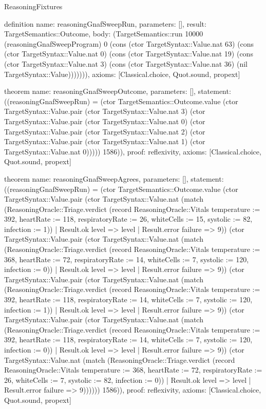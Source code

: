 \begin{lexlean}{ReasoningFixtures}
\begin{semanticmodule}
definition{
  name: reasoningGnafSweepRun,
  parameters: [],
  result: TargetSemantics::Outcome,
  body: (TargetSemantics::run 10000 (reasoningGnafSweepProgram) 0 (cons (ctor TargetSyntax::Value.nat 63) (cons (ctor TargetSyntax::Value.nat 0) (cons (ctor TargetSyntax::Value.nat 19) (cons (ctor TargetSyntax::Value.nat 3) (cons (ctor TargetSyntax::Value.nat 36) (nil TargetSyntax::Value))))))),
  axioms: [Classical.choice, Quot.sound, propext]
}

theorem{
  name: reasoningGnafSweepOutcome,
  parameters: [],
  statement: ((reasoningGnafSweepRun) = (ctor TargetSemantics::Outcome.value (ctor TargetSyntax::Value.pair (ctor TargetSyntax::Value.nat 3) (ctor TargetSyntax::Value.pair (ctor TargetSyntax::Value.nat 0) (ctor TargetSyntax::Value.pair (ctor TargetSyntax::Value.nat 2) (ctor TargetSyntax::Value.pair (ctor TargetSyntax::Value.nat 1) (ctor TargetSyntax::Value.nat 0))))) 1586)),
  proof: reflexivity{},
  axioms: [Classical.choice, Quot.sound, propext]
}

theorem{
  name: reasoningGnafSweepAgrees,
  parameters: [],
  statement: ((reasoningGnafSweepRun) = (ctor TargetSemantics::Outcome.value (ctor TargetSyntax::Value.pair (ctor TargetSyntax::Value.nat (match (ReasoningOracle::Triage.verdict (record ReasoningOracle::Vitals {temperature := 392, heartRate := 118, respiratoryRate := 26, whiteCells := 15, systolic := 82, infection := 1}))
    | Result.ok level => level
    | Result.error failure => 9)) (ctor TargetSyntax::Value.pair (ctor TargetSyntax::Value.nat (match (ReasoningOracle::Triage.verdict (record ReasoningOracle::Vitals {temperature := 368, heartRate := 72, respiratoryRate := 14, whiteCells := 7, systolic := 120, infection := 0}))
    | Result.ok level => level
    | Result.error failure => 9)) (ctor TargetSyntax::Value.pair (ctor TargetSyntax::Value.nat (match (ReasoningOracle::Triage.verdict (record ReasoningOracle::Vitals {temperature := 392, heartRate := 118, respiratoryRate := 14, whiteCells := 7, systolic := 120, infection := 1}))
    | Result.ok level => level
    | Result.error failure => 9)) (ctor TargetSyntax::Value.pair (ctor TargetSyntax::Value.nat (match (ReasoningOracle::Triage.verdict (record ReasoningOracle::Vitals {temperature := 392, heartRate := 118, respiratoryRate := 14, whiteCells := 7, systolic := 120, infection := 0}))
    | Result.ok level => level
    | Result.error failure => 9)) (ctor TargetSyntax::Value.nat (match (ReasoningOracle::Triage.verdict (record ReasoningOracle::Vitals {temperature := 368, heartRate := 72, respiratoryRate := 26, whiteCells := 7, systolic := 82, infection := 0}))
    | Result.ok level => level
    | Result.error failure => 9)))))) 1586)),
  proof: reflexivity{},
  axioms: [Classical.choice, Quot.sound, propext]
}


\end{semanticmodule}
\end{lexlean}

